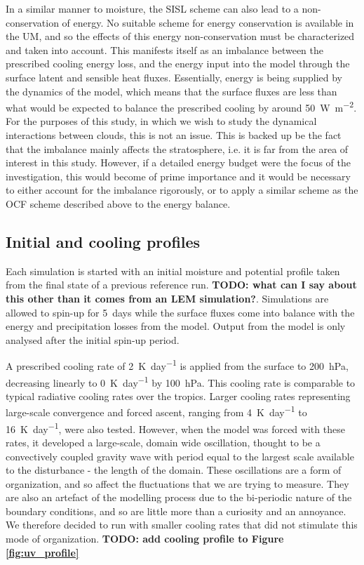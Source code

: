 \documentclass[11pt,a4paper]{article}
\newcommand\todo[1]{\textbf{TODO: #1}}
\begin{document}
In a similar manner to moisture, the SISL scheme can also lead to a non-conservation of energy. No suitable scheme for energy conservation is available in the UM, and so the effects of this energy non-conservation must be characterized and taken into account. This manifests itself as an imbalance between the prescribed cooling energy loss, and the energy input into the model through the surface latent and sensible heat fluxes. Essentially, energy is being supplied by the dynamics of the model, which means that the surface fluxes are less than what would be expected to balance the prescribed cooling by around \SI{50}{W.m^{-2}}.
For the purposes of this study, in which we wish to study the dynamical interactions between clouds, this is not an issue. This is backed up be the fact that the imbalance mainly affects the stratosphere, i.e. it is far from the area of interest in this study. However, if a detailed energy budget were the focus of the investigation, this would become of prime importance and it would be necessary to either account for the imbalance rigorously, or to apply a similar scheme as the OCF scheme described above to the energy balance. 

\subsection{Initial and cooling profiles}

Each simulation is started with an initial moisture and potential profile taken from the final state of a previous reference run. \todo{what can I say about this other than it comes from an LEM simulation?}. Simulations are allowed to spin-up for \SI{5}{days} while the surface fluxes come into balance with the energy and precipitation losses from the model. Output from the model is only analysed after the initial spin-up period.

A prescribed cooling rate of \SI{2}{K.day^{-1}} is applied from the surface to \SI{200}{hPa}, decreasing linearly to \SI{0}{K.day^{-1}} by \SI{100}{hPa}. This cooling rate is comparable to typical radiative cooling rates over the tropics. Larger cooling rates representing large-scale convergence and forced ascent, ranging from \SI{4}{K.day^{-1}} to \SI{16}{K.day^{-1}}, were also tested. However, when the model was forced with these rates, it developed a large-scale, domain wide oscillation, thought to be a convectively coupled gravity wave with period equal to the largest scale available to the disturbance - the length of the domain. These oscillations are a form of organization, and so affect the fluctuations that we are trying to measure. They are also an artefact of the modelling process due to the bi-periodic nature of the boundary conditions, and so are little more than a curiosity and an annoyance. We therefore decided to run with smaller cooling rates that did not stimulate this mode of organization.
\todo{add cooling profile to Figure \ref{fig:uv_profile}}
\end{document}
